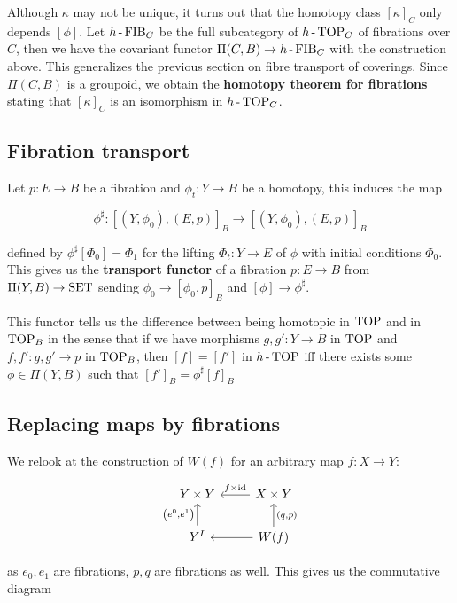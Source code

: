 Although $\kappa$ may not be unique, it turns out that the homotopy class $[\kappa]_C$ only depends $[\phi]$. Let $h\operatorname{-}\operatorname{FIB}_C$ be the full subcategory of $h\operatorname{-}\operatorname{TOP}_C$ of fibrations over $C$, then we have the covariant functor $\Pi(C,B)\to h\operatorname{-}\operatorname{FIB}_C$ with the construction above. This generalizes the previous section on fibre transport of coverings. Since $\Pi(C,B)$ is a groupoid, we obtain the \textbf{homotopy theorem for fibrations} stating that $[\kappa]_C$ is an isomorphism in $h\operatorname{-}\operatorname{TOP}_C$.

\subsection{Fibration transport}

Let $p:E\to B$ be a fibration and $\phi_t:Y\to B$ be a homotopy, this induces the map

\[\phi^\sharp:\left[\left(Y,\phi_0\right),\left(E,p\right)\right]_B\to\left[\left(Y,\phi_0\right),\left(E,p\right)\right]_B\]

defined by $\phi^\sharp\left[\Phi_0\right]=\Phi_1$ for the lifting $\Phi_t:Y\to E$ of $\phi$ with initial conditions $\Phi_0$. This gives us the \textbf{transport functor} of a fibration $p:E\to B$ from $\Pi(Y,B)\to\operatorname{SET}$ sending $\phi_0\to\left[\phi_0,p\right]_B$ and $[\phi]\to\phi^\sharp$.

This functor tells us the difference between being homotopic in $\operatorname{TOP}$ and in $\operatorname{TOP}_B$ in the sense that if we have morphisms $g,g':Y\to B$ in $\operatorname{TOP}$ and $f,f':g,g'\to p$ in $\operatorname{TOP}_B$, then $[f]=[f']$ in $h\operatorname{-}\operatorname{TOP}$ iff there exists some $\phi\in\Pi(Y,B)$ such that $[f']_B=\phi^\sharp[f]_B$

\subsection{Replacing maps by fibrations}

We relook at the construction of $W(f)$ for an arbitrary map $f:X\to Y$:

\[\begin{tikzcd}
	{Y\times Y} & {X\times Y} \\
	{Y^I} & {W(f)}
	\arrow["f\times\id"', from=1-2, to=1-1]
	\arrow["{\left(e^0,e^1\right)}", from=2-1, to=1-1]
	\arrow[from=2-2, to=2-1]
	\arrow["{\left(q,p\right)}"', from=2-2, to=1-2]
\end{tikzcd}\]

as $e_0,e_1$ are fibrations, $p,q$ are fibrations as well. This gives us the commutative diagram


